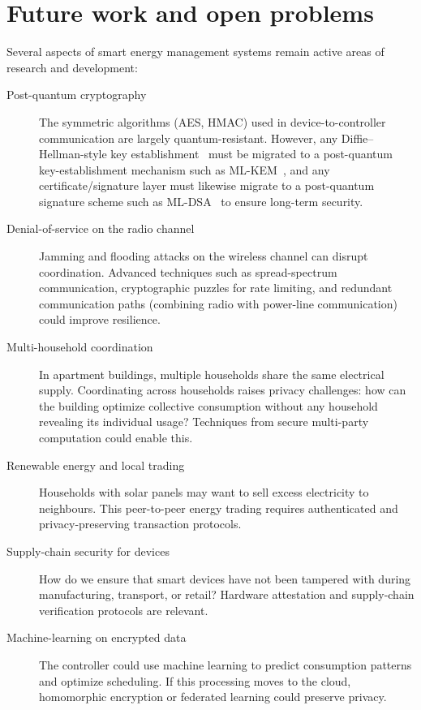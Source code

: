 \section{Future work and open problems}\label{EnergyFutureWork}


Several aspects of smart energy management systems remain active areas of
research and development:

\begin{description}
  \item[Post-quantum cryptography] The symmetric algorithms (AES,
    HMAC) used in device-to-controller communication are largely
    quantum-resistant.
    However, any Diffie--Hellman-style key
    establishment~\autocite{DiffieHellman} must be migrated to a
    post-quantum key-establishment mechanism such as
    ML-KEM~\autocite{FIPS203}, and any certificate/signature layer must
    likewise migrate to a post-quantum signature scheme such as
    ML-DSA~\autocite{FIPS204} to ensure long-term security.
  \item[Denial-of-service on the radio channel] Jamming and flooding
    attacks on the wireless channel can disrupt coordination.
    Advanced techniques such as spread-spectrum communication,
    cryptographic puzzles for rate limiting, and redundant communication
    paths (\eg combining radio with power-line communication) could
    improve resilience.
  \item[Multi-household coordination] In apartment buildings, multiple
    households share the same electrical supply.
    Coordinating across households raises privacy challenges: how can
    the building optimize collective consumption without any household
    revealing its individual usage?
    Techniques from secure multi-party computation could enable this.
  \item[Renewable energy and local trading] Households with solar panels
    may want to sell excess electricity to neighbours.
    This peer-to-peer energy trading requires authenticated and
    privacy-preserving transaction protocols.
  \item[Supply-chain security for devices] How do we ensure that smart
    devices have not been tampered with during manufacturing, transport,
    or retail?
    Hardware attestation and supply-chain verification protocols are
    relevant.
  \item[Machine-learning on encrypted data] The controller could use
    machine learning to predict consumption patterns and optimize
    scheduling.
    If this processing moves to the cloud, homomorphic encryption or
    federated learning could preserve privacy.
\end{description}

